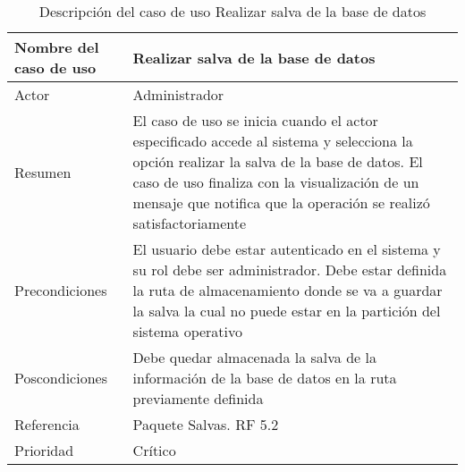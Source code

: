 \begin{table}[H]
	\sf
	\begin{supertabular}{|p{4.5cm}|p{12cm}|}
		\hline
		\textbf{Nombre del caso de uso}
		& \textbf{Realizar salva de la base de datos} \\ \hline
		
		Actor
		& Administrador \\ \hline
		
		Resumen
		& El caso de uso se inicia cuando el actor especificado accede al sistema y selecciona la opción realizar la salva de la base de datos. El caso de uso finaliza con la visualización de un mensaje que notifica que la operación se realizó satisfactoriamente \\ \hline
		
		Precondiciones
		& El usuario debe estar autenticado en el sistema y su rol debe ser administrador.
		Debe estar definida la ruta de almacenamiento donde se va a guardar la salva la cual no puede estar en la partición del sistema operativo \\ \hline
		
		Poscondiciones
		& Debe quedar almacenada la salva de la información de la base de datos en la ruta previamente definida \\ \hline
		
		Referencia
		& Paquete Salvas. RF 5.2 \\ \hline
		
		Prioridad
		& Crítico \\		
		\hline
	\end{supertabular}
	\caption[Descripción del caso de uso Realizar salva de la base de datos]{Descripción del caso de uso Realizar salva de la base de datos}
	\label{table:CU_SalvaBD}
\end{table}

